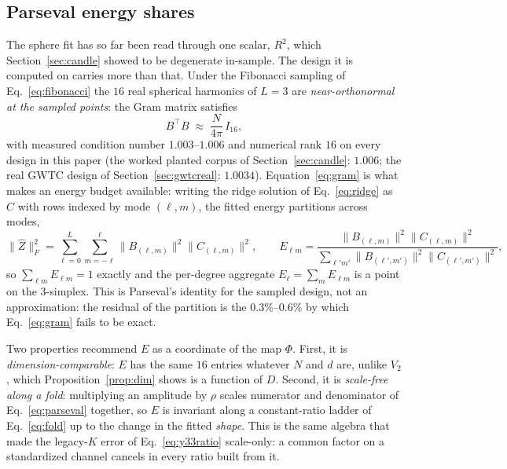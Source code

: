 \documentclass[11pt,a4paper]{article}
\theoremstyle{plain}
\theoremstyle{remark}
\theoremstyle{plain}
\begin{document}
\subsection{Parseval energy shares}
\label{sec:parseval}

The sphere fit has so far been read through one scalar, $R^2$, which Section~\ref{sec:candle} showed to be degenerate in-sample. The design it is computed on carries more than that. Under the Fibonacci sampling of Eq.~\eqref{eq:fibonacci} the $16$ real spherical harmonics of $L=3$ are \emph{near-orthonormal at the sampled points}: the Gram matrix satisfies
\begin{equation}
B^{\top}B\;\approx\;\frac{N}{4\pi}\,I_{16},
\label{eq:gram}
\end{equation}
with measured condition number $1.003$--$1.006$ and numerical rank $16$ on every design in this paper (the worked planted corpus of Section~\ref{sec:candle}: $1.006$; the real GWTC design of Section~\ref{sec:gwtcreal}: $1.0034$). Equation~\eqref{eq:gram} is what makes an energy budget available: writing the ridge solution of Eq.~\eqref{eq:ridge} as $C$ with rows indexed by mode $(\ell,m)$, the fitted energy partitions across modes,
\begin{equation}
\|\hat Z\|_F^2=\sum_{\ell=0}^{L}\sum_{m=-\ell}^{\ell}\big\|B_{(\ell,m)}\big\|^2\big\|C_{(\ell,m)}\big\|^2,
\qquad
E_{\ell m}=\frac{\big\|B_{(\ell,m)}\big\|^2\big\|C_{(\ell,m)}\big\|^2}{\sum_{\ell'm'}\big\|B_{(\ell',m')}\big\|^2\big\|C_{(\ell',m')}\big\|^2},
\label{eq:parseval}
\end{equation}
so $\sum_{\ell m}E_{\ell m}=1$ exactly and the per-degree aggregate $E_\ell=\sum_mE_{\ell m}$ is a point on the $3$-simplex. This is Parseval's identity for the sampled design, not an approximation: the residual of the partition is the $0.3\%$--$0.6\%$ by which Eq.~\eqref{eq:gram} fails to be exact.

Two properties recommend $E$ as a coordinate of the map $\Phi$. First, it is \emph{dimension-comparable}: $E$ has the same $16$ entries whatever $N$ and $d$ are, unlike $V_2$, which Proposition~\ref{prop:dim} shows is a function of $D$. Second, it is \emph{scale-free along a fold}: multiplying an amplitude by $\rho$ scales numerator and denominator of Eq.~\eqref{eq:parseval} together, so $E$ is invariant along a constant-ratio ladder of Eq.~\eqref{eq:fold} up to the change in the fitted \emph{shape}. This is the same algebra that made the legacy-$K$ error of Eq.~\eqref{eq:y33ratio} scale-only: a common factor on a standardized channel cancels in every ratio built from it.
\end{document}
